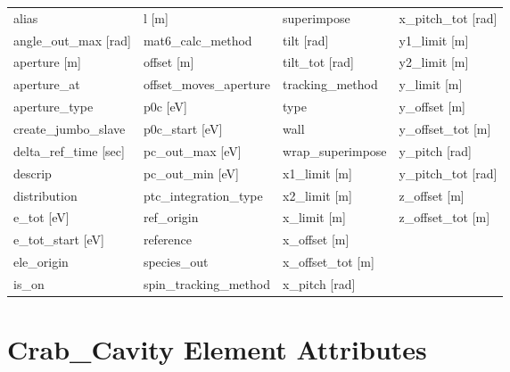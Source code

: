  \begin{tabular}{llll} \toprule
alias                            & l [m]                            & superimpose                      & x_pitch_tot [rad]                \\
angle_out_max [rad]              & mat6_calc_method                 & tilt [rad]                       & y1_limit [m]                     \\
aperture [m]                     & offset [m]                       & tilt_tot [rad]                   & y2_limit [m]                     \\
aperture_at                      & offset_moves_aperture            & tracking_method                  & y_limit [m]                      \\
aperture_type                    & p0c [eV]                         & type                             & y_offset [m]                     \\
create_jumbo_slave               & p0c_start [eV]                   & wall                             & y_offset_tot [m]                 \\
delta_ref_time [sec]             & pc_out_max [eV]                  & wrap_superimpose                 & y_pitch [rad]                    \\
descrip                          & pc_out_min [eV]                  & x1_limit [m]                     & y_pitch_tot [rad]                \\
distribution                     & ptc_integration_type             & x2_limit [m]                     & z_offset [m]                     \\
e_tot [eV]                       & ref_origin                       & x_limit [m]                      & z_offset_tot [m]                 \\
e_tot_start [eV]                 & reference                        & x_offset [m]                     &                                  \\
ele_origin                       & species_out                      & x_offset_tot [m]                 &                                  \\
is_on                            & spin_tracking_method             & x_pitch [rad]                    &                                  \\
 \bottomrule
 \end{tabular}
 \vfill
 
 \section{Crab_Cavity Element Attributes}
 \label{s:list.crab.cavity}
 
